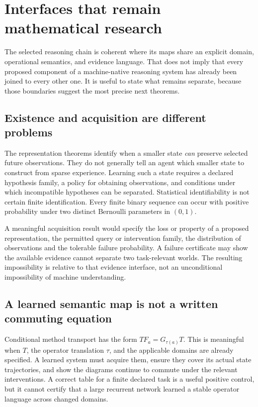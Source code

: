 \chapter{Interfaces that remain mathematical research}\label{ch:frontier}

The selected reasoning chain is coherent where its maps share an explicit domain, operational semantics, and evidence language. That does not imply that every proposed component of a machine-native reasoning system has already been joined to every other one. It is useful to state what remains separate, because those boundaries suggest the most precise next theorems.

\section{Existence and acquisition are different problems}
The representation theorems identify when a smaller state \emph{can} preserve selected future observations. They do not generally tell an agent which smaller state to construct from sparse experience. Learning such a state requires a declared hypothesis family, a policy for obtaining observations, and conditions under which incompatible hypotheses can be separated. Statistical identifiability is not certain finite identification. Every finite binary sequence can occur with positive probability under two distinct Bernoulli parameters in $(0,1)$.

A meaningful acquisition result would specify the loss or property of a proposed representation, the permitted query or intervention family, the distribution of observations and the tolerable failure probability. A failure certificate may show the available evidence cannot separate two task-relevant worlds. The resulting impossibility is relative to that evidence interface, not an unconditional impossibility of machine understanding.

\section{A learned semantic map is not a written commuting equation}
Conditional method transport has the form $TF_a=G_{\tau(a)}T$. This is meaningful when $T$, the operator translation $\tau$, and the applicable domains are already specified. A learned system must acquire them, ensure they cover its actual state trajectories, and show the diagrams continue to commute under the relevant interventions. A correct table for a finite declared task is a useful positive control, but it cannot certify that a large recurrent network learned a stable operator language across changed domains.

